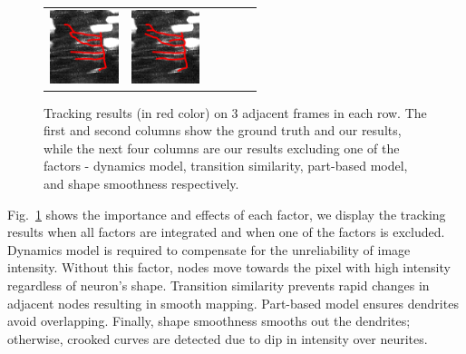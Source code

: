 \documentclass{article}
\begin{document}
\begin{figure}[t!]
\begin{tabular}{cccccc}
		{\includegraphics[width=2cm]{img/repul_t3.png}} &  
		{\includegraphics[width=2cm]{img/shape_t3.png}}  \\
	\end{tabular}
	\vspace{-10pt}
	\caption{\small{Tracking results (in red color) on 3 adjacent frames in each row. The first and second columns show the ground truth and our results, while the next four columns are our results excluding one of the factors - dynamics model, transition similarity, part-based model, and shape smoothness respectively. }}
	\label{fig:factors}
	\vspace{-10pt}
\end{figure}
Fig.~\ref{fig:factors} shows the importance and effects of each factor, we display the tracking results when all factors are integrated and when one of the factors is excluded. Dynamics model is required to compensate for the unreliability of image intensity. Without this factor, nodes move towards the pixel with high intensity regardless of neuron's shape. Transition similarity prevents rapid changes in adjacent nodes resulting in smooth mapping. Part-based model ensures dendrites avoid overlapping. Finally, shape smoothness smooths out the dendrites; otherwise, crooked curves are detected due to dip in intensity over neurites. 
\end{document}
